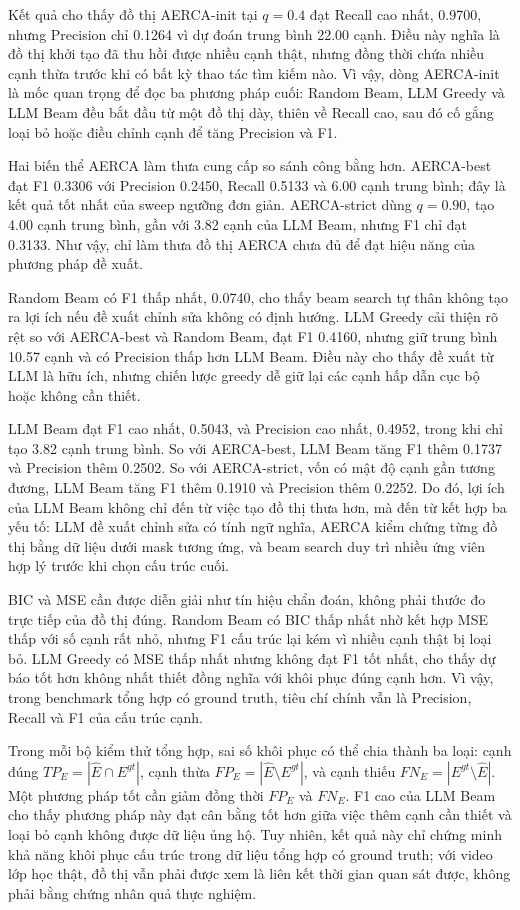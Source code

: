 Kết quả cho thấy đồ thị AERCA-init tại \(q=0.4\) đạt Recall cao nhất, 0.9700, nhưng Precision chỉ 0.1264 vì dự đoán trung bình 22.00 cạnh. Điều này nghĩa là đồ thị khởi tạo đã thu hồi được nhiều cạnh thật, nhưng đồng thời chứa nhiều cạnh thừa trước khi có bất kỳ thao tác tìm kiếm nào. Vì vậy, dòng AERCA-init là mốc quan trọng để đọc ba phương pháp cuối: Random Beam, LLM Greedy và LLM Beam đều bắt đầu từ một đồ thị dày, thiên về Recall cao, sau đó cố gắng loại bỏ hoặc điều chỉnh cạnh để tăng Precision và F1.

Hai biến thể AERCA làm thưa cung cấp so sánh công bằng hơn. AERCA-best đạt F1 0.3306 với Precision 0.2450, Recall 0.5133 và 6.00 cạnh trung bình; đây là kết quả tốt nhất của sweep ngưỡng đơn giản. AERCA-strict dùng \(q=0.90\), tạo 4.00 cạnh trung bình, gần với 3.82 cạnh của LLM Beam, nhưng F1 chỉ đạt 0.3133. Như vậy, chỉ làm thưa đồ thị AERCA chưa đủ để đạt hiệu năng của phương pháp đề xuất.

Random Beam có F1 thấp nhất, 0.0740, cho thấy beam search tự thân không tạo ra lợi ích nếu đề xuất chỉnh sửa không có định hướng. LLM Greedy cải thiện rõ rệt so với AERCA-best và Random Beam, đạt F1 0.4160, nhưng giữ trung bình 10.57 cạnh và có Precision thấp hơn LLM Beam. Điều này cho thấy đề xuất từ LLM là hữu ích, nhưng chiến lược greedy dễ giữ lại các cạnh hấp dẫn cục bộ hoặc không cần thiết.

LLM Beam đạt F1 cao nhất, 0.5043, và Precision cao nhất, 0.4952, trong khi chỉ tạo 3.82 cạnh trung bình. So với AERCA-best, LLM Beam tăng F1 thêm 0.1737 và Precision thêm 0.2502. So với AERCA-strict, vốn có mật độ cạnh gần tương đương, LLM Beam tăng F1 thêm 0.1910 và Precision thêm 0.2252. Do đó, lợi ích của LLM Beam không chỉ đến từ việc tạo đồ thị thưa hơn, mà đến từ kết hợp ba yếu tố: LLM đề xuất chỉnh sửa có tính ngữ nghĩa, AERCA kiểm chứng từng đồ thị bằng dữ liệu dưới mask tương ứng, và beam search duy trì nhiều ứng viên hợp lý trước khi chọn cấu trúc cuối.

BIC và MSE cần được diễn giải như tín hiệu chẩn đoán, không phải thước đo trực tiếp của đồ thị đúng. Random Beam có BIC thấp nhất nhờ kết hợp MSE thấp với số cạnh rất nhỏ, nhưng F1 cấu trúc lại kém vì nhiều cạnh thật bị loại bỏ. LLM Greedy có MSE thấp nhất nhưng không đạt F1 tốt nhất, cho thấy dự báo tốt hơn không nhất thiết đồng nghĩa với khôi phục đúng cạnh hơn. Vì vậy, trong benchmark tổng hợp có ground truth, tiêu chí chính vẫn là Precision, Recall và F1 của cấu trúc cạnh.

Trong mỗi bộ kiểm thử tổng hợp, sai số khôi phục có thể chia thành ba loại: cạnh đúng \(TP_E=|\hat{E}\cap E^{gt}|\), cạnh thừa \(FP_E=|\hat{E}\setminus E^{gt}|\), và cạnh thiếu \(FN_E=|E^{gt}\setminus \hat{E}|\). Một phương pháp tốt cần giảm đồng thời \(FP_E\) và \(FN_E\). F1 cao của LLM Beam cho thấy phương pháp này đạt cân bằng tốt hơn giữa việc thêm cạnh cần thiết và loại bỏ cạnh không được dữ liệu ủng hộ. Tuy nhiên, kết quả này chỉ chứng minh khả năng khôi phục cấu trúc trong dữ liệu tổng hợp có ground truth; với video lớp học thật, đồ thị vẫn phải được xem là liên kết thời gian quan sát được, không phải bằng chứng nhân quả thực nghiệm.